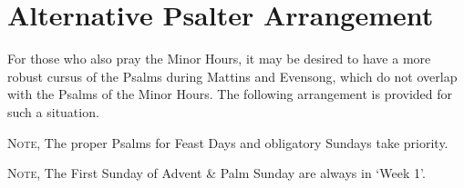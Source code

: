 \fancyhead[RE,LO]{}
\section{Alternative Psalter Arrangement}
\begin{secrubric}
	For those who also pray the Minor Hours, it may be desired to have a more robust cursus of the Psalms during Mattins and Evensong, which do not overlap with the Psalms of the Minor Hours. The following arrangement is provided for such a situation.
\end{secrubric}
\begin{rubric}
		\textsc{Note,} The proper Psalms for Feast Days and obligatory Sundays take priority.
\end{rubric}
\begin{rubric}
	\textsc{Note,} The First Sunday of Advent \& Palm Sunday are always in `Week 1'.
\end{rubric}

